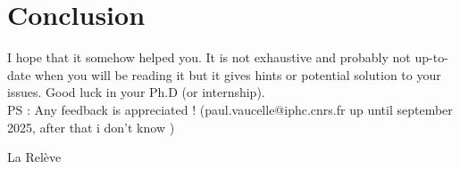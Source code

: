 \documentclass[reprint, a4paper, nofootinbib, amsmath, amssymb, aps]{revtex4-1}
\begin{document}
\section{Conclusion}

I hope that it somehow helped you. It is not exhaustive and probably not up-to-date when you will be reading it but it gives hints or potential solution to your issues. Good luck in your Ph.D (or internship).\\
PS : Any feedback is appreciated ! (paul.vaucelle@iphc.cnrs.fr up until september 2025, after that i don't know )

La Relève 
\end{document}
